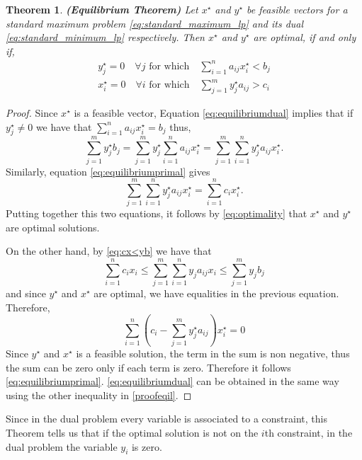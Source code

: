 \documentclass[a4paper,12pt]{article}
\newtheorem{Teo}{Theorem}
\begin{document}
\begin{Teo} \label{EquilibriumTheorem}
\textbf{(Equilibrium Theorem)} 
Let $x^\star$ and $y^\star$ be feasible vectors for a standard maximum problem \eqref{eq:standard_maximum_lp} and its dual \eqref{eq:standard_minimum_lp} respectively. Then $x^\star$ and $y^\star$ are optimal, if and only if,
\begin{align}
y_j^\star = 0 \quad \forall j  \text{ for which} \quad \sum_{i=1}^n a_{ij}x_i^\star < b_j
\label{eq:equilibriumdual} \\
x_i^\star = 0 \quad \forall i  \text{ for which} \quad \sum_{j=1 }^m y_j^\star a_{ij} > c_i \label{eq:equilibriumprimal}
\end{align}
\end{Teo}
\begin{proof}
Since $x^\star$ is a feasible vector, Equation \eqref{eq:equilibriumdual} implies that if $y_j^\star \neq 0$ we have that  $\sum_{i=1}^n a_{ij}x_i^\star = b_j$ thus,
\[
\sum_{j = 1}^m y_j^\star b_j = \sum_{j = 1}^m y_j^\star \sum_{i = 1}^n a_{ij}x_i^\star 
= \sum_{j = 1}^m  \sum_{i = 1}^n y_j^\star a_{ij}x_i^\star.
\]
Similarly, equation \eqref{eq:equilibriumprimal} gives
\[
\sum_{j = 1}^m  \sum_{i = 1}^n y_j^\star a_{ij}x_i^\star = \sum_{i = 1}^n c_i x_i^\star.
\]
Putting together this two equations, it follows by \eqref{eq:optimality} that $x^\star$ and $y^\star$ are optimal solutions. 

On the other hand, by \eqref{eq:cx<yb} we have that 
\begin{equation}
\label{proofeqil}
\sum_{i = 1}^n c_i x_i \leq \sum_{j = 1}^m  \sum_{i = 1}^n y_j a_{ij}x_i 
\leq \sum_{j = 1}^m y_j b_j
\end{equation}
and since $y^\star$ and $x^\star$ are optimal, we have equalities in the previous equation. Therefore, 
\[
\sum_{i = 1}^n \left(c_i  - \sum_{j = 1}^m   y_j^\star a_{ij} \right) x_i^\star = 0 
\]
Since $y^\star$ and $x^\star$ is a feasible solution, the term in the sum is non negative, thus the sum can be zero only if each term is zero. Therefore it follows \eqref{eq:equilibriumprimal}. \eqref{eq:equilibriumdual} can be obtained in the same way using the other inequality in \eqref{proofeqil}.
\end{proof}

Since in the dual problem every variable is associated to a constraint, this Theorem tells us that if the optimal solution is not on the $i$th constraint, in the dual problem the variable $y_i$ is zero. 

\newpage
\end{document}
